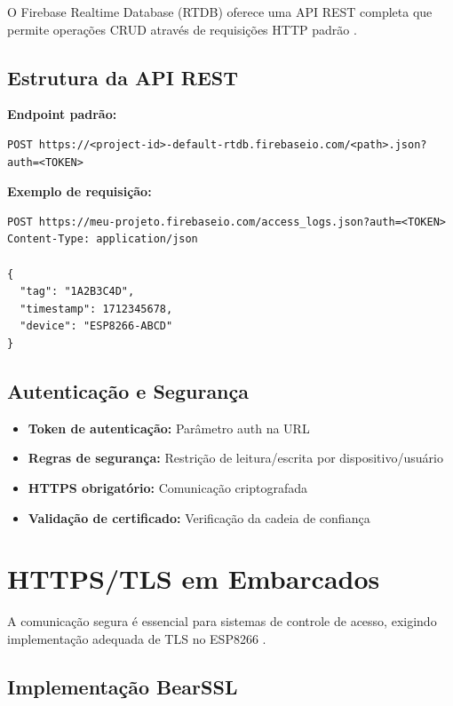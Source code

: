 O Firebase Realtime Database (RTDB) oferece uma API REST completa que permite operações CRUD através de requisições HTTP padrão \cite{firebase-rtdb}.

\subsection{Estrutura da API REST}

\textbf{Endpoint padrão:}
\begin{verbatim}
POST https://<project-id>-default-rtdb.firebaseio.com/<path>.json?auth=<TOKEN>
\end{verbatim}

\textbf{Exemplo de requisição:}
\begin{verbatim}
POST https://meu-projeto.firebaseio.com/access_logs.json?auth=<TOKEN>
Content-Type: application/json

{
  "tag": "1A2B3C4D",
  "timestamp": 1712345678,
  "device": "ESP8266-ABCD"
}
\end{verbatim}

\subsection{Autenticação e Segurança}

\begin{itemize}
\item \textbf{Token de autenticação:} Parâmetro auth na URL
\item \textbf{Regras de segurança:} Restrição de leitura/escrita por dispositivo/usuário
\item \textbf{HTTPS obrigatório:} Comunicação criptografada
\item \textbf{Validação de certificado:} Verificação da cadeia de confiança
\end{itemize}

\section{HTTPS/TLS em Embarcados}
\label{sec:https-tls}

A comunicação segura é essencial para sistemas de controle de acesso, exigindo implementação adequada de TLS no ESP8266 \cite{mdn-https,esp8266-bearssl}.

\subsection{Implementação BearSSL}

